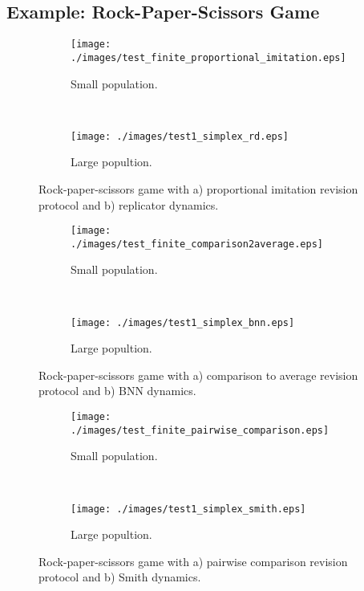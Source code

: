 \subsection{Example: Rock-Paper-Scissors Game}



\begin{figure}[th]
  \centering
  \begin{subfigure}[b]{0.4\textwidth}
	  \texttt{[image: ./images/test\_finite\_proportional\_imitation.eps]}
	  \caption{Small population.}
	  \label{fig:finite1_protocol}
  \end{subfigure}
  ~ 
  \begin{subfigure}[b]{0.4\textwidth}
	  \texttt{[image: ./images/test1\_simplex\_rd.eps]}
	  \caption{Large popultion.}
	  \label{fig:finite1_dynamics}
  \end{subfigure}
  \caption{Rock-paper-scissors game with a) proportional imitation revision protocol and b) replicator dynamics.}
  \label{fig:finite1}
\end{figure}


\begin{figure}[th]
  \centering
  \begin{subfigure}[b]{0.4\textwidth}
	  \texttt{[image: ./images/test\_finite\_comparison2average.eps]}
	  \caption{Small population.}
	  \label{fig:finite2_protocol}
  \end{subfigure}
  ~ 
  \begin{subfigure}[b]{0.4\textwidth}
	  \texttt{[image: ./images/test1\_simplex\_bnn.eps]}
	  \caption{Large popultion.}
	  \label{fig:finite2_dynamics}
  \end{subfigure}
  \caption{Rock-paper-scissors game with a) comparison to average revision protocol and b) BNN dynamics.}
  \label{fig:finite2}
\end{figure}


\begin{figure}[tbh]
  \centering
  \begin{subfigure}[b]{0.4\textwidth}
	  \texttt{[image: ./images/test\_finite\_pairwise\_comparison.eps]}
	  \caption{Small population.}
	  \label{fig:finite3_protocol}
  \end{subfigure}
  ~ 
  \begin{subfigure}[b]{0.4\textwidth}
	  \texttt{[image: ./images/test1\_simplex\_smith.eps]}
	  \caption{Large popultion.}
	  \label{fig:finite3_dynamics}
  \end{subfigure}
  \caption{Rock-paper-scissors game with a) pairwise comparison revision protocol and b) Smith dynamics.}
  \label{fig:finite3}
\end{figure}


